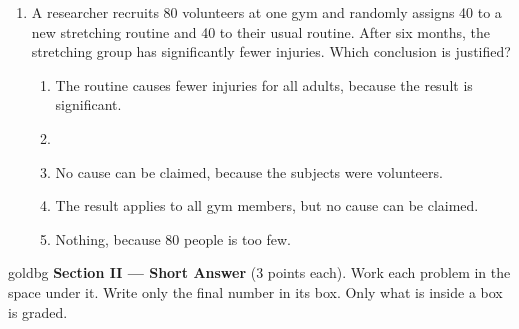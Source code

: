\documentclass[12pt]{article}
\begin{document}
\begin{enumerate}[leftmargin=1.9em, itemsep=0.13in]
  \boxguard[13]
  \item A researcher recruits 80 volunteers at one gym and randomly assigns 40 to a new
        stretching routine and 40 to their usual routine. After six months, the stretching
        group has significantly fewer injuries. Which conclusion is justified?
        \begin{enumerate}[label=\textbf{(\Alph*)}, leftmargin=2.2em, itemsep=2pt]
          \item The routine causes fewer injuries for all adults, because the result is
                significant.
          \item {}
          \item No cause can be claimed, because the subjects were volunteers.
          \item The result applies to all gym members, but no cause can be claimed.
          \item Nothing, because 80 people is too few.\hfill{}\rule[-0.2in]{0pt}{0.48in}
        \end{enumerate}

\end{enumerate}

\vspace{0.14in}

\boxguard[22]
\begin{headlinebox}{goldbg}
\small
\textbf{Section II --- Short Answer} (3 points each). Work each problem in the space under it.
Write only the final number in its box. Only what is inside a box is graded.
\end{headlinebox}

\vspace{0.10in}
\end{document}

